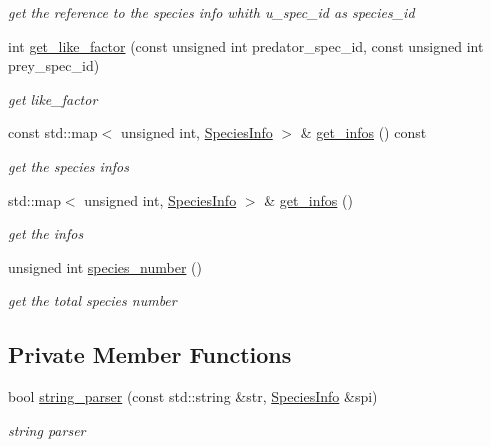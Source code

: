 \begin{DoxyCompactItemize}
\begin{DoxyCompactList}\small\item\em get the reference to the species info whith u\_\-spec\_\-id as species\_\-id \end{DoxyCompactList}\item 
int \hyperlink{classSpeciesController_a467ef1497b83bb2ae5f0990cab611c34}{get\_\-like\_\-factor} (const unsigned int predator\_\-spec\_\-id, const unsigned int prey\_\-spec\_\-id)
\begin{DoxyCompactList}\small\item\em get like\_\-factor \end{DoxyCompactList}\item 
const std::map$<$ unsigned int, \hyperlink{structSpeciesInfo}{SpeciesInfo} $>$ \& \hyperlink{classSpeciesController_ae3173c4b361dcbe2e8efb0c0f6e80486}{get\_\-infos} () const 
\begin{DoxyCompactList}\small\item\em get the species infos \end{DoxyCompactList}\item 
\hypertarget{classSpeciesController_af22a0989362a058602cc7e039ce0182f}{
std::map$<$ unsigned int, \hyperlink{structSpeciesInfo}{SpeciesInfo} $>$ \& \hyperlink{classSpeciesController_af22a0989362a058602cc7e039ce0182f}{get\_\-infos} ()}
\label{classSpeciesController_af22a0989362a058602cc7e039ce0182f}

\begin{DoxyCompactList}\small\item\em get the infos \end{DoxyCompactList}\item 
\hypertarget{classSpeciesController_abd757b3bd462b28307a93e3fe1857832}{
unsigned int \hyperlink{classSpeciesController_abd757b3bd462b28307a93e3fe1857832}{species\_\-number} ()}
\label{classSpeciesController_abd757b3bd462b28307a93e3fe1857832}

\begin{DoxyCompactList}\small\item\em get the total species number \end{DoxyCompactList}\end{DoxyCompactItemize}
\subsection*{Private Member Functions}
\begin{DoxyCompactItemize}
\item 
bool \hyperlink{classSpeciesController_a67380eb665706237de2207d46125a82b}{string\_\-parser} (const std::string \&str, \hyperlink{structSpeciesInfo}{SpeciesInfo} \&spi)
\begin{DoxyCompactList}\small\item\em string parser \end{DoxyCompactList}\end{DoxyCompactItemize}
